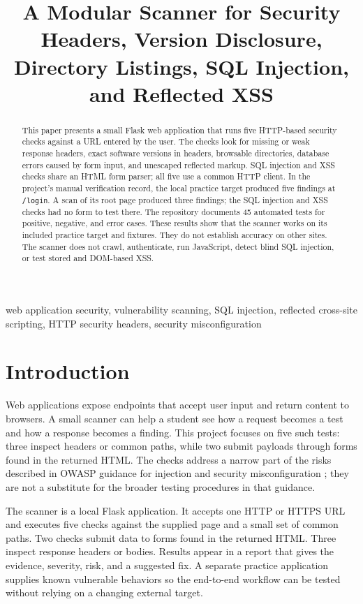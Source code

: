 \documentclass[conference]{IEEEtran}
\title{A Modular Scanner for Security Headers, Version Disclosure, Directory Listings, SQL Injection, and Reflected XSS}
\author{
\IEEEauthorblockN{Ayush Saraf}
\IEEEauthorblockA{Vellore Institute of Technology\\
ayush.saraf2023@vitstudent.ac.in}
\and
\IEEEauthorblockN{Shlok Lobhas Ghadekar}
\IEEEauthorblockA{Vellore Institute of Technology\\
shlok.lobhas2023@vitstudent.ac.in}
\and
\IEEEauthorblockN{Ankush}
\IEEEauthorblockA{Vellore Institute of Technology\\
ankush.2023@vitstudent.ac.in}
}
\begin{document}
\maketitle

\begin{abstract}
This paper presents a small Flask web application that runs five HTTP-based
security checks against a URL entered by the user. The checks look for missing
or weak response headers, exact software versions in headers, browsable
directories, database errors caused by form input, and unescaped reflected
markup. SQL injection and XSS checks share an HTML form parser; all five use a
common HTTP client. In the project’s manual verification record, the local
practice target produced five findings at \texttt{/login}. A scan of its root
page produced three findings; the SQL injection and XSS checks had no form to
test there. The repository documents 45 automated tests for positive, negative,
and error cases. These results show that the scanner works on its included
practice target and fixtures. They do not establish accuracy on other sites.
The scanner does not crawl, authenticate, run JavaScript, detect blind SQL
injection, or test stored and DOM-based XSS.
\end{abstract}

\begin{IEEEkeywords}
web application security, vulnerability scanning, SQL injection, reflected
cross-site scripting, HTTP security headers, security misconfiguration
\end{IEEEkeywords}

\section{Introduction}
Web applications expose endpoints that accept user input and return content to
browsers. A small scanner can help a student see how a request becomes a test
and how a response becomes a finding. This project focuses on five such tests:
three inspect headers or common paths, while two submit payloads through forms
found in the returned HTML. The checks address a narrow part of the risks
described in OWASP guidance for injection and security misconfiguration
\cite{owaspTop10,wstgSQLi,wstgXSS}; they are not a substitute for the broader
testing procedures in that guidance.

The scanner is a local Flask application. It accepts one HTTP or HTTPS URL and
executes five checks against the supplied page and a small set of common paths.
Two checks submit data to forms found in the returned HTML. Three inspect
response headers or bodies. Results appear in a report that gives the evidence,
severity, risk, and a suggested fix. A separate practice application supplies
known vulnerable behaviors so the end-to-end workflow can be tested without
relying on a changing external target.
\end{document}
